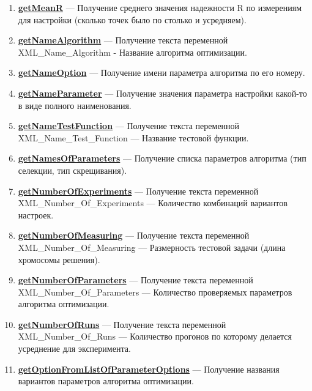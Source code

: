 \documentclass[a4paper,12pt]{article}
\begin{document}
\begin{enumerate}
\item \textbf{\hyperref[getMeanR]{getMeanR}} --- Получение среднего значения надежности R по измерениям для настройки (сколько точек было по столько и усредняем).

\item \textbf{\hyperref[getNameAlgorithm]{getNameAlgorithm}} --- Получение текста переменной  XML\_Name\_Algorithm - Название алгоритма оптимизации.

\item \textbf{\hyperref[getNameOption]{getNameOption}} --- Получение имени параметра алгоритма по его номеру.

\item \textbf{\hyperref[getNameParameter]{getNameParameter}} --- Получение значения параметра настройки какой-то в виде полного наименования.

\item \textbf{\hyperref[getNameTestFunction]{getNameTestFunction}} --- Получение текста переменной  XML\_Name\_Test\_Function --- Название тестовой функции.

\item \textbf{\hyperref[getNamesOfParameters]{getNamesOfParameters}} --- Получение списка параметров алгоритма (тип селекции, тип скрещивания).

\item \textbf{\hyperref[getNumberOfExperiments]{getNumberOfExperiments}} --- Получение текста переменной  XML\_Number\_Of\_Experiments --- Количество комбинаций вариантов настроек.

\item \textbf{\hyperref[getNumberOfMeasuring]{getNumberOfMeasuring}} --- Получение текста переменной  XML\_Number\_Of\_Measuring --- Размерность тестовой задачи (длина хромосомы решения).

\item \textbf{\hyperref[getNumberOfParameters]{getNumberOfParameters}} --- Получение текста переменной  XML\_Number\_Of\_Parameters --- Количество проверяемых параметров алгоритма оптимизации.

\item \textbf{\hyperref[getNumberOfRuns]{getNumberOfRuns}} --- Получение текста переменной  XML\_Number\_Of\_Runs --- Количество прогонов по которому делается усреднение для эксперимента.

\item \textbf{\hyperref[getOptionFromListOfParameterOptions]{getOptionFromListOfParameterOptions}} --- Получение названия вариантов параметров алгоритма оптимизации.


\end{enumerate}
\end{document}
